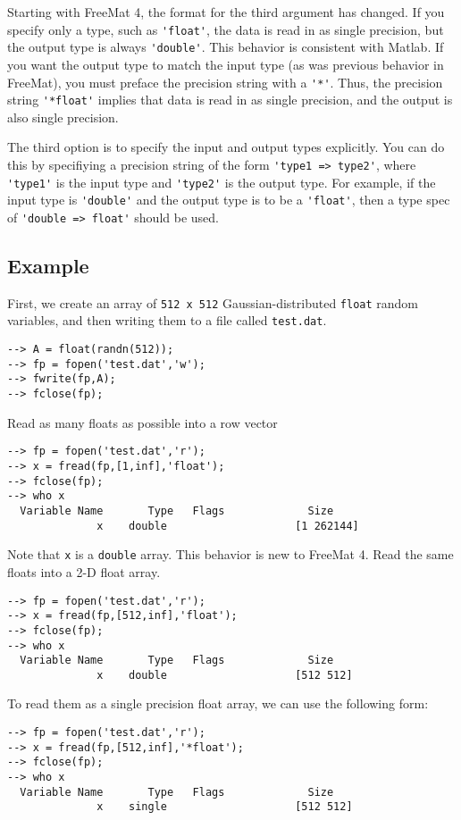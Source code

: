 Starting with FreeMat 4, the format for the third argument has changed.
If you specify only a type, such as \verb|'float'|, the data is read in as
single precision, but the output type is always \verb|'double'|.  This behavior
is consistent with Matlab.  If you want the output type to match the input
type (as was previous behavior in FreeMat), you must preface the precision
string with a \verb|'*'|.  Thus, the precision string \verb|'*float'| implies
that data is read in as single precision, and the output is also single
precision.

The third option is to specify the input and output types explicitly.
You can do this by specifiying a precision string of the form 
\verb|'type1 => type2'|, where \verb|'type1'| is the input type and 
\verb|'type2'| is the output type.  For example, if the input type is
\verb|'double'| and the output type is to be a \verb|'float'|, then a type spec
of \verb|'double => float'| should be used.

\subsection{Example}

First, we create an array of \verb|512 x 512| Gaussian-distributed \verb|float| random variables, and then writing them to a file called \verb|test.dat|.
\begin{verbatim}
--> A = float(randn(512));
--> fp = fopen('test.dat','w');
--> fwrite(fp,A);
--> fclose(fp);
\end{verbatim}
Read as many floats as possible into a row vector
\begin{verbatim}
--> fp = fopen('test.dat','r');
--> x = fread(fp,[1,inf],'float');
--> fclose(fp);
--> who x
  Variable Name       Type   Flags             Size
              x    double                    [1 262144]
\end{verbatim}
Note that \verb|x| is a \verb|double| array.  This behavior is new to FreeMat 4.
Read the same floats into a 2-D float array.
\begin{verbatim}
--> fp = fopen('test.dat','r');
--> x = fread(fp,[512,inf],'float');
--> fclose(fp);
--> who x
  Variable Name       Type   Flags             Size
              x    double                    [512 512]
\end{verbatim}
To read them as a single precision float array, we can use the
following form:
\begin{verbatim}
--> fp = fopen('test.dat','r');
--> x = fread(fp,[512,inf],'*float');
--> fclose(fp);
--> who x
  Variable Name       Type   Flags             Size
              x    single                    [512 512]
\end{verbatim}

